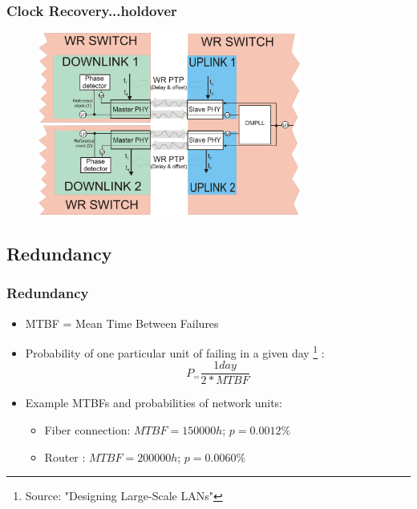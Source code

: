 \documentclass[]{beamer}
\begin{document}
\begin{frame}
  \frametitle{Clock Recovery...holdover}   %
\begin{figure}[tbp] %
  \centering

  \includegraphics[height=6cm,keepaspectratio]{../../figures/robustness/layer1redundancy2.png}



\end{figure}
\end{frame}


\subsection{Redundancy}

\begin{frame}
  \frametitle{Redundancy}
	\begin{itemize}
	\item MTBF = Mean Time Between Failures
	\item Probability of one particular unit of failing in a given day \footnote{Source: "Designing Large-Scale LANs"} :
	\begin{equation}
		P_= \frac{1 day}{2*MTBF}  
	\end{equation}
	
	\item Example MTBFs and probabilities of network units:
	  \begin{itemize}
	  \item Fiber connection: $MTBF=150 000h$; $p=0.0012\%$
	  \item Router : $MTBF=200 000h$; $p=0.0060\%$
	  \end{itemize}

	\end{itemize}
\end{frame}
\end{document}
